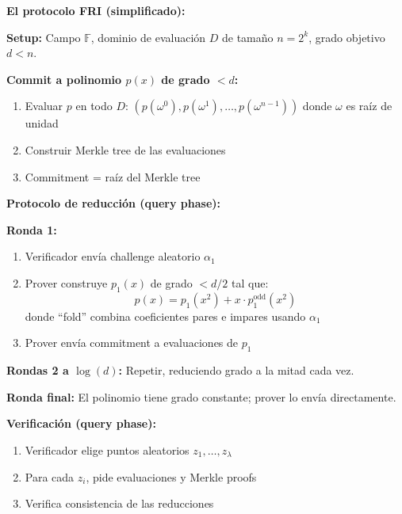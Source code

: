 \documentclass[11pt,a4paper,twoside,openright]{book}
\theoremstyle{definition}
\theoremstyle{plain}
\theoremstyle{remark}
\begin{document}
\begin{mathnote}
\textbf{El protocolo FRI (simplificado):}

\textbf{Setup:} Campo $\mathbb{F}$, dominio de evaluación $D$ de tamaño $n = 2^k$, grado objetivo $d < n$.

\textbf{Commit a polinomio $p(x)$ de grado $< d$:}
\begin{enumerate}
    \item Evaluar $p$ en todo $D$: $(p(\omega^0), p(\omega^1), \ldots, p(\omega^{n-1}))$ donde $\omega$ es raíz de unidad
    \item Construir Merkle tree de las evaluaciones
    \item Commitment = raíz del Merkle tree
\end{enumerate}

\textbf{Protocolo de reducción (query phase):}

\textbf{Ronda 1:}
\begin{enumerate}
    \item Verificador envía challenge aleatorio $\alpha_1$
    \item Prover construye $p_1(x)$ de grado $< d/2$ tal que:
    \[ p(x) = p_1(x^2) + x \cdot p_1^{\text{odd}}(x^2) \]
    donde ``fold'' combina coeficientes pares e impares usando $\alpha_1$
    \item Prover envía commitment a evaluaciones de $p_1$
\end{enumerate}

\textbf{Rondas 2 a $\log(d)$:} Repetir, reduciendo grado a la mitad cada vez.

\textbf{Ronda final:} El polinomio tiene grado constante; prover lo envía directamente.

\textbf{Verificación (query phase):}
\begin{enumerate}
    \item Verificador elige puntos aleatorios $z_1, \ldots, z_\lambda$
    \item Para cada $z_i$, pide evaluaciones y Merkle proofs
    \item Verifica consistencia de las reducciones
\end{enumerate}
\end{mathnote}
\end{document}
